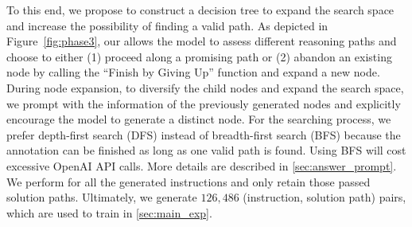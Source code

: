 To this end, we propose to construct a decision tree to expand the search space and increase the possibility of finding a valid path. As depicted in Figure~\ref{fig:phase3}, our \dfs allows the model to assess different reasoning paths and choose to either (1) proceed along a promising path or (2) abandon an existing node by calling the ``Finish by Giving Up'' function and expand a new node. During node expansion, to diversify the child nodes and expand the search space, we prompt \turbo with the information of the previously generated nodes and explicitly encourage the model to generate a distinct node. For the searching process, we prefer depth-first search (DFS) instead of breadth-first search (BFS) because the annotation can be finished as long as one valid path is found. Using BFS will cost excessive OpenAI API calls. More details are described in \cref{sec:answer_prompt}.
We perform \dfs for all the generated instructions and only retain those passed solution paths. Ultimately, we generate $126,486$ (instruction, solution path) pairs, which are used to train \ourmodel in \cref{sec:main_exp}. %